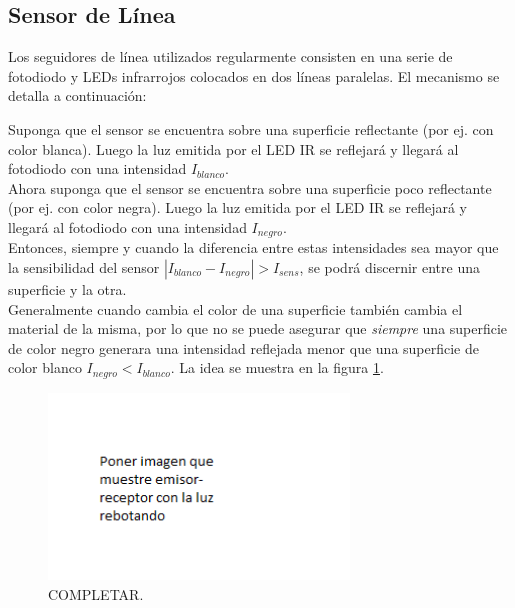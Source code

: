 \documentclass[10pt,conference,a4paper,onecolumn]{article}%
\begin{document}
\subsection{Sensor de Línea}
Los seguidores de línea utilizados regularmente consisten en una serie de fotodiodo y LEDs infrarrojos colocados en dos líneas paralelas. El mecanismo se detalla a continuación:

Suponga que el sensor se encuentra sobre una superficie reflectante (por ej. con color blanca). Luego la luz emitida por el LED IR se reflejará y llegará al fotodiodo con una intensidad $I_{blanco}$.\\
Ahora suponga que el sensor se encuentra sobre una superficie poco reflectante (por ej. con color negra). Luego la luz emitida por el LED IR se reflejará y llegará al fotodiodo con una intensidad $I_{negro}$.\\
Entonces, siempre y cuando la diferencia entre estas intensidades sea mayor que la sensibilidad del sensor  $|I_{blanco} - I_{negro} |> I_{sens}$, se podrá discernir entre una superficie y la otra. \\
Generalmente cuando cambia el color de una superficie también cambia el material de la misma, por lo que no se puede asegurar que \textit{siempre} una superficie de color negro generara una intensidad reflejada menor que una superficie de color blanco $I_{negro} <I_{blanco}$. 
 La idea se muestra en la figura \ref{fig:sensorLinea}.
\begin{figure}[h]
\centering
\includegraphics[width=8cm]{./imagenes/sensorLinea.png}
\caption{COMPLETAR.}
\label{fig:sensorLinea}
\end{figure}
\end{document}
